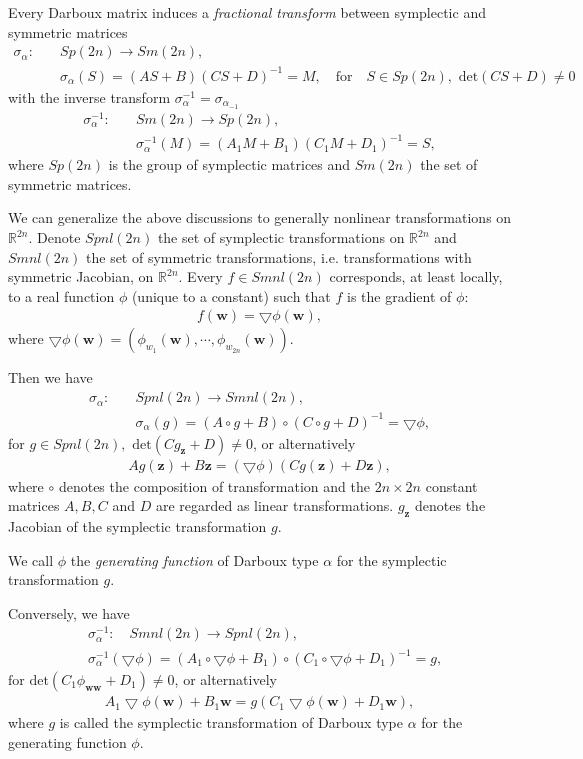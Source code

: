 \documentclass[a4paper,a4paper]{article}
\def\z{\boldsymbol{z}}
\def\ww{\boldsymbol{w}}
\begin{document}
Every Darboux matrix induces a {\em fractional transform } between symplectic and
symmetric matrices
\begin{align*}
 \sigma_{\alpha}:\quad & Sp(2n)\to Sm(2n),\\
  &\sigma_{\alpha}(S)=(AS+B)(CS+D)^{-1}=M, \quad \text{for}\quad S \in Sp(2n),
  \,\, \text{det}(CS+D)\ne0
\end{align*}
with the inverse transform $\sigma_{\alpha}^{-1}=\sigma_{\alpha_{-1}}$
\begin{align*}
 \sigma_{\alpha}^{-1}:\quad  &Sm(2n)\to Sp(2n),\\
  &\sigma_{\alpha}^{-1}(M)=(A_{1}M+B_{1})(C_{1}M+D_{1})^{-1}=S,
\end{align*}
where $Sp(2n)$ is the group of symplectic matrices and $Sm(2n)$ the set of symmetric
matrices.

We can generalize the above discussions to generally nonlinear
transformations on $\mathbb{R}^{2n}$. Denote $Spnl(2n)$ the set of
symplectic transformations on $\mathbb{R}^{2n}$ and $Smnl(2n)$ the
set of  symmetric transformations, i.e. transformations with
symmetric Jacobian, on $\mathbb{R}^{2n}$. Every $f\in Smnl(2n)$
corresponds, at least locally, to a real function $\phi$ (unique
to a constant) such that $f$ is the gradient of $\phi$:
\begin{align}
      f(\ww)=\bigtriangledown \phi(\ww), \label{4.3}
\end{align}
where $\bigtriangledown \phi(\ww)=(\phi_{w_{1}}(\ww), \cdots, \phi_{w_{2n}}(\ww))$.

Then we have
 \begin{align*}
 \sigma_{\alpha}:\quad & Spnl(2n)\to Smnl(2n),\\
  &\sigma_{\alpha}(g)=(A\circ g+B)\circ (C\circ g+D)^{-1}=
  \bigtriangledown \phi,
\end{align*}
for $g \in Spnl(2n),
  \,\, \text{det}(Cg_{\z}+D) \ne 0$, or alternatively
\begin{align*}
  Ag(\z)+B\z=(\bigtriangledown \phi)(Cg(\z)+D\z),
\end{align*}
where $\circ$ denotes the composition of transformation and the $2n\times 2n$
constant matrices $A, B, C$ and $D$ are regarded as linear transformations.
$g_{\z}$ denotes the Jacobian of the symplectic transformation $g$.

We call $\phi$ the {\em generating function} of Darboux type $\alpha$ for the
symplectic transformation $g$.

Conversely, we have
\begin{align*}
 &\sigma_{\alpha}^{-1}:\quad  Smnl(2n)\to Spnl(2n),\\
  &\sigma_{\alpha}^{-1}(\bigtriangledown \phi)=(A_{1}\circ \bigtriangledown \phi
  +B_{1})\circ (C_{1}\circ \bigtriangledown \phi+D_{1})^{-1}=g, %
\end{align*} $\text{for} \,\, \text{det}(C_{1}\phi_{\ww\ww}+D_{1}) \ne 0$,
or alternatively
\begin{align*}
 A_{1}\bigtriangledown \phi(\ww)+B_{1}\ww=g(C_{1}\bigtriangledown \phi(\ww)
  +D_{1}\ww),
\end{align*}
where $g$ is called the symplectic transformation of Darboux type $\alpha$ for the
generating function $\phi$.
\end{document}
